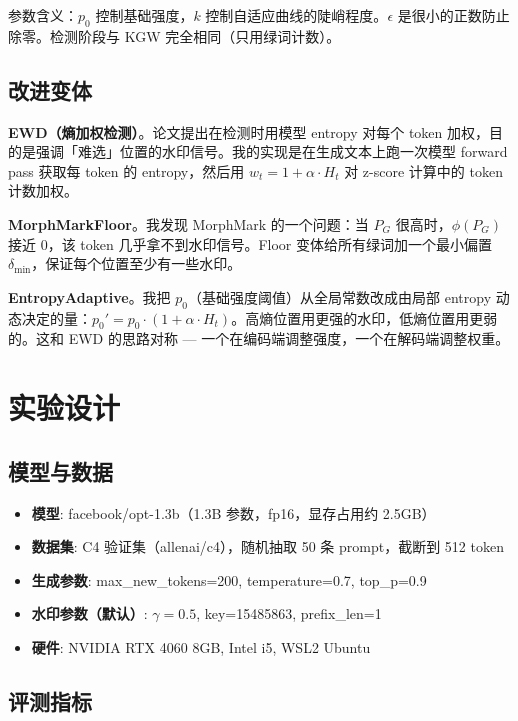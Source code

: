 \documentclass[11pt,a4paper]{article}
\begin{document}
参数含义：$p_0$ 控制基础强度，$k$ 控制自适应曲线的陡峭程度。$\epsilon$ 是很小的正数防止除零。检测阶段与 KGW 完全相同（只用绿词计数）。

\subsection{改进变体}

\textbf{EWD（熵加权检测）}。论文提出在检测时用模型 entropy 对每个 token 加权，目的是强调「难选」位置的水印信号。我的实现是在生成文本上跑一次模型 forward pass 获取每 token 的 entropy，然后用 $w_t = 1 + \alpha \cdot H_t$ 对 z-score 计算中的 token 计数加权。

\textbf{MorphMarkFloor}。我发现 MorphMark 的一个问题：当 $P_G$ 很高时，$\phi(P_G)$ 接近 0，该 token 几乎拿不到水印信号。Floor 变体给所有绿词加一个最小偏置 $\delta_{\min}$，保证每个位置至少有一些水印。

\textbf{EntropyAdaptive}。我把 $p_0$（基础强度阈值）从全局常数改成由局部 entropy 动态决定的量：$p_0' = p_0 \cdot (1 + \alpha \cdot H_t)$。高熵位置用更强的水印，低熵位置用更弱的。这和 EWD 的思路对称 — 一个在编码端调整强度，一个在解码端调整权重。

\section{实验设计}

\subsection{模型与数据}

\begin{itemize}[nosep]
  \item \textbf{模型}: facebook/opt-1.3b（1.3B 参数，fp16，显存占用约 2.5GB）
  \item \textbf{数据集}: C4 验证集（allenai/c4），随机抽取 50 条 prompt，截断到 512 token
  \item \textbf{生成参数}: max\_new\_tokens=200, temperature=0.7, top\_p=0.9
  \item \textbf{水印参数（默认）}: $\gamma=0.5$, key=15485863, prefix\_len=1
  \item \textbf{硬件}: NVIDIA RTX 4060 8GB, Intel i5, WSL2 Ubuntu
\end{itemize}

\subsection{评测指标}
\end{document}
